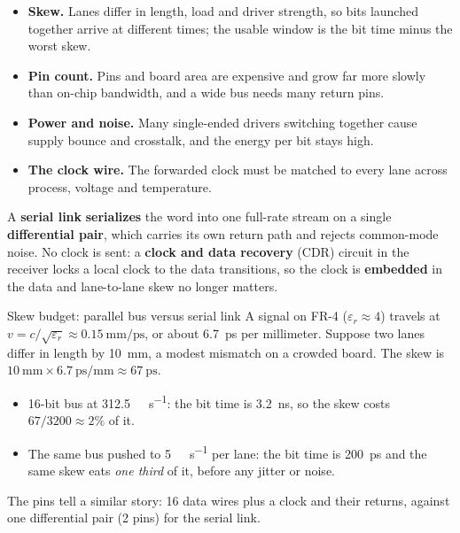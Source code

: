 \begin{itemize}
  \item \textbf{Skew.} Lanes differ in length, load and driver strength, so bits launched together arrive at different times; the usable window is the bit time minus the worst skew.
  \item \textbf{Pin count.} Pins and board area are expensive and grow far more slowly than on-chip bandwidth, and a wide bus needs many return pins.
  \item \textbf{Power and noise.} Many single-ended drivers switching together cause supply bounce and crosstalk, and the energy per bit stays high.
  \item \textbf{The clock wire.} The forwarded clock must be matched to every lane across process, voltage and temperature.
\end{itemize}

A \textbf{serial link} \textbf{serializes} the word into one full-rate stream on a single \textbf{differential pair}, which carries its own return path and rejects common-mode noise. No clock is sent: a \textbf{clock and data recovery} (CDR) circuit in the receiver locks a local clock to the data transitions, so the clock is \textbf{embedded} in the data and lane-to-lane skew no longer matters.

\begin{example}{Skew budget: parallel bus versus serial link}\label{we:ch1-skew}
A signal on FR-4 ($\varepsilon_r \approx 4$) travels at $v = c/\sqrt{\varepsilon_r} \approx \qty{0.15}{\milli\meter\per\pico\second}$, or about \qty{6.7}{\pico\second} per millimeter. Suppose two lanes differ in length by \qty{10}{\milli\meter}, a modest mismatch on a crowded board. The skew is $\qty{10}{\milli\meter}\times\qty{6.7}{\pico\second\per\milli\meter} \approx \qty{67}{\pico\second}$.
\begin{itemize}
  \item 16-bit bus at \qty{312.5}{\mega\bit\per\second}: the bit time is \qty{3.2}{\nano\second}, so the skew costs $67/3200 \approx 2\%$ of it.
  \item The same bus pushed to \qty{5}{\giga\bit\per\second} per lane: the bit time is \qty{200}{\pico\second} and the same skew eats \emph{one third} of it, before any jitter or noise.
\end{itemize}
The pins tell a similar story: 16 data wires plus a clock and their returns, against one differential pair (2 pins) for the serial link.
\end{example}

